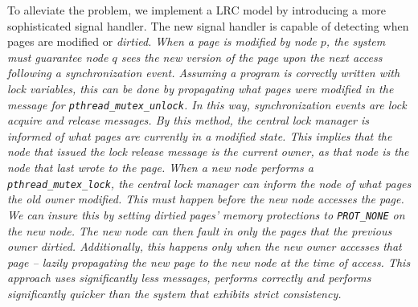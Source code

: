 To alleviate the problem, we implement a LRC model by introducing a more sophisticated signal handler.  The new signal handler is capable of detecting when pages are modified or \em dirtied\em.  When a page is modified by node $p$, the system must guarantee node $q$ sees the new version of the page upon the next access following a synchronization event.  Assuming a program is correctly written with lock variables, this can be done by propagating what pages were modified in the message for \verb,pthread_mutex_unlock,.  In this way, synchronization events are lock acquire and release messages.  By this method, the central lock manager is informed of what pages are currently in a modified state.  This implies that the node that issued the lock release message is the current owner, as that node is the node that last wrote to the page.  When a new node performs a \verb,pthread_mutex_lock,, the central lock manager can inform the node of what pages the old owner modified.  This must happen before the new node accesses the page.  We can insure this by setting dirtied pages' memory protections to \verb,PROT_NONE, on the new node.  The new node can then fault in only the pages that the previous owner dirtied.  Additionally, this happens only when the new owner accesses that page -- lazily propagating the new page to the new node at the time of access.  This approach uses significantly less messages, performs correctly and performs significantly quicker than the system that exhibits \em strict consistency\em.






